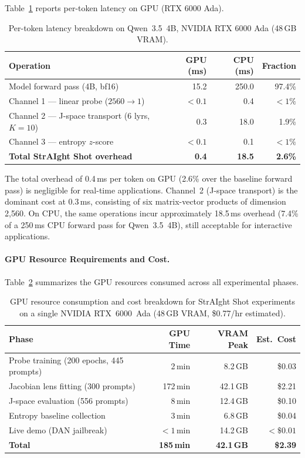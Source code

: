 \documentclass[11pt]{article}
\begin{document}
Table~\ref{tab:perf} reports per-token latency on GPU (RTX 6000 Ada).

\begin{table}[H]
\centering
\caption{Per-token latency breakdown on Qwen~3.5~4B, NVIDIA RTX 6000 Ada (48\,GB VRAM).}
\label{tab:perf}
\begin{tabular}{lrrr}
\toprule
\textbf{Operation} & \textbf{GPU (ms)} & \textbf{CPU (ms)} & \textbf{Fraction} \\
\midrule
Model forward pass (4B, bf16)            & 15.2  & 250.0  & 97.4\% \\
Channel 1 — linear probe ($2560 \to 1$)   & $<0.1$ & 0.4    & $<1\%$ \\
Channel 2 — J-space transport (6 lyrs, $K{=}10$) & 0.3   & 18.0   & 1.9\% \\
Channel 3 — entropy $z$-score             & $<0.1$ & 0.1    & $<1\%$ \\
\midrule
\textbf{Total StrAIght Shot overhead}      & \textbf{0.4} & \textbf{18.5} & \textbf{2.6\%} \\
\bottomrule
\end{tabular}
\end{table}

The total overhead of 0.4\,ms per token on GPU (2.6\% over the baseline forward pass) is negligible for real-time applications. Channel~2 (J-space transport) is the dominant cost at 0.3\,ms, consisting of six matrix-vector products of dimension 2,560. On CPU, the same operations incur approximately 18.5\,ms overhead (7.4\% of a 250\,ms CPU forward pass for Qwen~3.5~4B), still acceptable for interactive applications.

\paragraph{GPU Resource Requirements and Cost.}
Table~\ref{tab:gpu_cost} summarizes the GPU resources consumed across all experimental phases.

\begin{table}[H]
\centering
\caption{GPU resource consumption and cost breakdown for StrAIght Shot experiments on a single NVIDIA RTX~6000~Ada (48\,GB VRAM, \$0.77/hr estimated).}
\label{tab:gpu_cost}
\begin{tabular}{lrrr}
\toprule
\textbf{Phase} & \textbf{GPU Time} & \textbf{VRAM Peak} & \textbf{Est.\ Cost} \\
\midrule
Probe training (200 epochs, 445 prompts)  & 2\,min   & 8.2\,GB  & \$0.03 \\
Jacobian lens fitting (300 prompts)       & 172\,min & 42.1\,GB & \$2.21 \\
J-space evaluation (556 prompts)          & 8\,min   & 12.4\,GB & \$0.10 \\
Entropy baseline collection               & 3\,min   & 6.8\,GB  & \$0.04 \\
Live demo (DAN jailbreak)                 & $<1$\,min & 14.2\,GB & $<\$0.01$ \\
\midrule
\textbf{Total}                             & \textbf{185\,min} & \textbf{42.1\,GB} & \textbf{\$2.39} \\
\bottomrule
\end{tabular}
\end{table}
\end{document}
